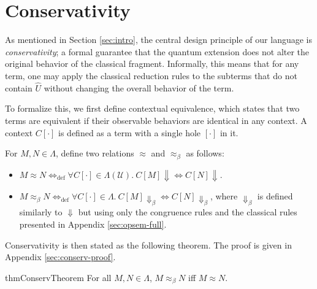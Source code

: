 \section{Conservativity}
As mentioned in Section \ref{sec:intro}, the central design principle of our language is \textit{conservativity}; a formal guarantee that the quantum extension does not alter the original behavior of the classical fragment.
Informally, this means that for any term, one may apply the classical reduction rules to the subterms that do not contain $\hat{U}$ without changing the overall behavior of the term.

To formalize this, we first define contextual equivalence, which states that two terms are equivalent if their observable behaviors are identical in any context.
A context $C[\cdot]$ is defined as a term with a single hole $[\cdot]$ in it.

\begin{dfn} \label{def:contextual-equiv}
  For $M, N \in \Lambda$, define two relations $\approx$ and $\approx_\beta$ as follows:
  \begin{itemize}
    \item $M\approx N \Leftrightarrow_\mathrm{def} \forall C[\cdot]\in\Lambda(\mathcal{U}).\ C[M] \Downarrow \Leftrightarrow C[N] \Downarrow$.
    \item $M\approx_\beta N \Leftrightarrow_\mathrm{def} \forall C[\cdot]\in\Lambda.\ C[M] \Downarrow_\beta \Leftrightarrow C[N] \Downarrow_\beta$, where $\Downarrow_\beta$ is defined similarly to $\Downarrow$ but using only the congruence rules and the classical rules presented in Appendix \ref{sec:opsem-full}.
  \end{itemize}
\end{dfn}

Conservativity is then stated as the following theorem. The proof is given in Appendix \ref{sec:conserv-proof}.
\begin{restatable}[Conservativity]{thm}{ConservTheorem} \label{thm:conservativity}
  For all $M, N \in \Lambda$, $M \approx_\beta N$ iff $M \approx N$.
\end{restatable}
